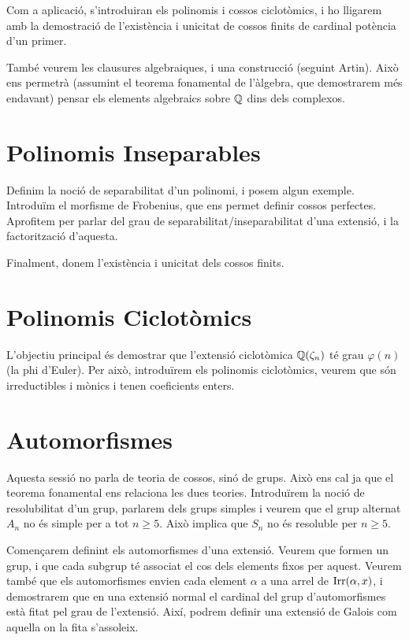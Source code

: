 \documentclass[
]{book}
\theoremstyle{definition}
\theoremstyle{definition}
\theoremstyle{definition}
\theoremstyle{definition}
\theoremstyle{remark}
\begin{document}
Com a aplicació, s'introduiran els polinomis i cossos ciclotòmics, i ho lligarem amb la
demostració de l'existència i unicitat de cossos finits de cardinal potència d'un primer.

També veurem les clausures algebraiques, i una construcció (seguint Artin). Això ens permetrà (assumint el teorema fonamental
de l'àlgebra, que demostrarem més endavant) pensar els elements algebraics sobre \(\mathbb{Q}\) dins dels complexos.

\hypertarget{polinomis-inseparables}{%
\chapter{Polinomis Inseparables}\label{polinomis-inseparables}}

Definim la noció de separabilitat d'un polinomi, i posem algun exemple. Introduïm el morfisme de Frobenius,
que ens permet definir cossos perfectes. Aprofitem per parlar del grau de separabilitat/inseparabilitat d'una
extensió, i la factorització d'aquesta.

Finalment, donem l'existència i unicitat dels cossos finits.

\hypertarget{polinomis-ciclotuxf2mics}{%
\chapter{Polinomis Ciclotòmics}\label{polinomis-ciclotuxf2mics}}

L'objectiu principal és demostrar que l'extensió ciclotòmica \(\mathbb{Q}(\zeta_n)\) té grau \(\varphi(n)\) (la phi d'Euler). Per això,
introduïrem els polinomis ciclotòmics, veurem que són irreductibles i mònics i tenen coeficients enters.

\hypertarget{automorfismes}{%
\chapter{Automorfismes}\label{automorfismes}}

Aquesta sessió no parla de teoria de cossos, sinó de grups. Això ens cal ja que el teorema fonamental ens relaciona les dues teories. Introduïrem
la noció de resolubilitat d'un grup, parlarem dels grups simples i veurem que el grup alternat \(A_n\) no és simple per a tot \(n \geq 5\). Això
implica que \(S_n\) no és resoluble per \(n\geq 5\).

Començarem definint els automorfismes d'una extensió. Veurem que formen
un grup, i que cada subgrup té associat el cos dels elements fixos per aquest. Veurem també
que els automorfismes envien cada element \(\alpha\) a una arrel de \(\operatorname{Irr}(\alpha,x)\),
i demostrarem que en una extensió normal el cardinal del grup d'automorfismes està
fitat pel grau de l'extensió. Així, podrem definir una extensió de Galois com aquella
on la fita s'assoleix.
\end{document}
